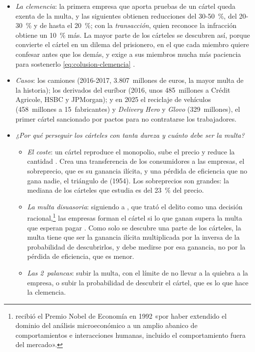 \documentclass[11pt]{article}
\begin{document}
\begin{itemize}
\item \emph{La clemencia}\nocite{UE2006Clemencia}: la primera empresa que aporta pruebas de un cártel queda exenta de la multa, y las siguientes obtienen reducciones del 30-50~\%, del 20-30~\% y de hasta el 20~\%; con la \emph{transacción}, quien reconoce la infracción obtiene un 10~\% más. La mayor parte de los cárteles se descubren así, porque convierte el cártel en un dilema del prisionero, en el que cada miembro quiere confesar antes que los demás, y exige a sus miembros mucha más paciencia para sostenerlo \eqref{eq:colusion-clemencia}  .
\item \emph{Casos}: los camiones (2016-2017, 3.807~millones de euros, la mayor multa de la historia); los derivados del euríbor (2016, unos 485~millones a Crédit Agricole, HSBC y JPMorgan); y en 2025 el reciclaje de vehículos (458~millones a 15~fabricantes) y \emph{Delivery Hero} y \emph{Glovo} (329~millones), el primer cártel sancionado por pactos para no contratarse los trabajadores\nocite{CE2026Carteles}.
\item \emph{¿Por qué perseguir los cárteles con tanta dureza y cuánto debe ser la multa?}
  \begin{itemize}
  \item \emph{El coste}: un cártel reproduce el monopolio, sube el precio y reduce la cantidad . Crea una transferencia de los consumidores a las empresas, el sobreprecio, que es su ganancia ilícita, y una pérdida de eficiencia que no gana nadie, el triángulo de  (1954)\nocite{Harberger1954Monopoly}. Los sobreprecios son grandes: la mediana de los cárteles que estudia \textcite{Connor2014Price} es del 23~\% del precio.
  \item \emph{La multa disuasoria}: siguiendo a \textcite{Becker1968Crime}, que trató el delito como una decisión racional,\footnote{ recibió el Premio Nobel de Economía en 1992 «por haber extendido el dominio del análisis microeconómico a un amplio abanico de comportamientos e interacciones humanas, incluido el comportamiento fuera del mercado»\nocite{Nobel1992Becker}.} las empresas forman el cártel si lo que ganan supera la multa que esperan pagar \parencite{Landes1983Optimal}. Como solo se descubre una parte de los cárteles, la multa tiene que ser la ganancia ilícita multiplicada por la inversa de la probabilidad de descubrirlos, y debe medirse por esa ganancia, no por la pérdida de eficiencia, que es menor.
  \item \emph{Las 2~palancas}: subir la multa, con el límite de no llevar a la quiebra a la empresa, o subir la probabilidad de descubrir el cártel, que es lo que hace la clemencia.

\end{itemize}
\end{itemize}
\end{document}
